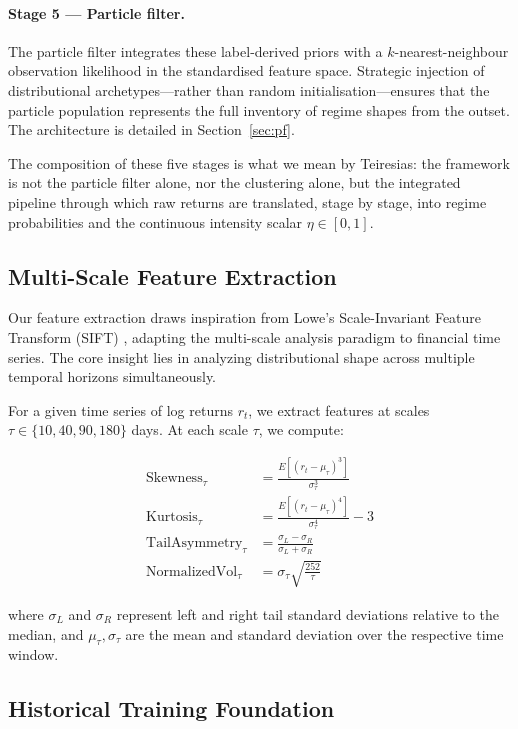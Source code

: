 \documentclass[11pt]{article}
\begin{document}
\paragraph{Stage 5 --- Particle filter.}
The particle filter integrates these label-derived priors with a
$k$-nearest-neighbour observation likelihood in the standardised feature
space. Strategic injection of distributional archetypes---rather than
random initialisation---ensures that the particle population represents
the full inventory of regime shapes from the outset. The architecture is
detailed in Section~\ref{sec:pf}.

The composition of these five stages is what we mean by Teiresias: the
framework is not the particle filter alone, nor the clustering alone, but
the integrated pipeline through which raw returns are translated, stage
by stage, into regime probabilities and the continuous intensity scalar
$\eta \in [0,1]$.

\subsection{Multi-Scale Feature Extraction}
\label{sec:features}

Our feature extraction draws inspiration from Lowe's Scale-Invariant
Feature Transform (SIFT) \citep{Lowe2004}, adapting the multi-scale
analysis paradigm to financial time series. The core insight lies in
analyzing distributional shape across multiple temporal horizons
simultaneously.

For a given time series of log returns $r_t$, we extract features at
scales $\tau \in \{10, 40, 90, 180\}$ days. At each scale $\tau$, we
compute:

\begin{align}
\mathrm{Skewness}_\tau &= \frac{E[(r_t - \mu_\tau)^3]}{\sigma_\tau^3} \\[4pt]
\mathrm{Kurtosis}_\tau &= \frac{E[(r_t - \mu_\tau)^4]}{\sigma_\tau^4} - 3 \\[4pt]
\mathrm{TailAsymmetry}_\tau &= \frac{\sigma_L - \sigma_R}{\sigma_L + \sigma_R} \\[4pt]
\mathrm{NormalizedVol}_\tau &= \sigma_\tau \sqrt{\frac{252}{\tau}}
\end{align}

where $\sigma_L$ and $\sigma_R$ represent left and right tail standard
deviations relative to the median, and $\mu_\tau, \sigma_\tau$ are the
mean and standard deviation over the respective time window.

\subsection{Historical Training Foundation}
\end{document}
